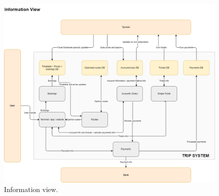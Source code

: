 \begin{figure}[H]
    \centering
    \includegraphics[width=\textwidth]{drawings/views_draft3/information_view.png}
    \caption{Information view.}
    \label{fig:information_view}
\end{figure}
